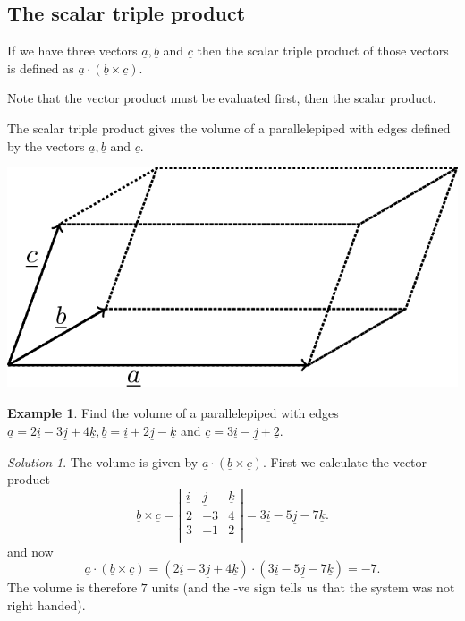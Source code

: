 \documentclass[
  11pt,
  oneside]{book}
\newcommand{\slide}{}
\theoremstyle{definition}
\theoremstyle{definition}
\newtheorem{example}{Example}[chapter]
\theoremstyle{definition}
\theoremstyle{definition}
\theoremstyle{remark}
\newtheorem*{solution}{Solution}
\begin{document}
\slide

\subsection{The scalar triple product}\label{the-scalar-triple-product}

If we have three vectors \(\underline a, \underline b\) and \(\underline c\) then the scalar triple product of those vectors is defined as \(\underline a \cdot(\underline b\times\underline c)\).

Note that the vector product must be evaluated first, then the scalar product.

The scalar triple product gives the volume of a parallelepiped with edges defined by the vectors \(\underline a, \underline b\) and \(\underline c\).

\begin{center}\includegraphics[width=0.35\linewidth]{tikztopng-figure64} \end{center}

\slide

\begin{example}
Find the volume of a parallelepiped with edges \(\underline a = 2\underline i - 3\underline j + 4\underline k, \underline b = \underline i + 2\underline j - \underline k\) and \(\underline c = 3\underline i - \underline j + \underline 2\).
\end{example}

\begin{solution}
The volume is given by \(\underline a \cdot(\underline b\times\underline c)\). First we calculate the vector product
\[
\underline b \times\underline c = \left|\begin{array}{ccc}\underline i&\underline j&\underline k\\2&-3&4\\3&-1&2\\\end{array}\right| = 3\underline i-5\underline j-7\underline k.
\]
and now
\[
\underline a \cdot(\underline b\times\underline c) = (2\underline i - 3\underline j + 4\underline k)\cdot(3\underline i-5\underline j-7\underline k) = -7.
\]
The volume is therefore \(7\) units (and the -ve sign tells us that the system was not right handed).
\end{solution}
\end{document}
